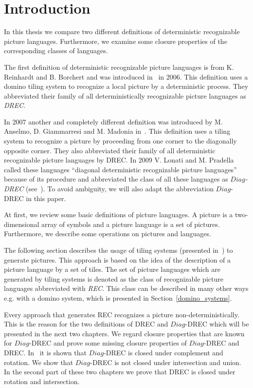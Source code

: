 \section{Introduction}

In this thesis we compare two different definitions of deterministic recognizable picture
languages. Furthermore, we examine some closure properties of the corresponding classes of
languages.

The first definition of deterministic recognizable picture languages is from K. Reinhardt and B.
Borchert and was introduced in~\cite{borchert2006deterministically} in 2006. This definition uses a
domino tiling system to recognize a local picture by a deterministic process. They abbreviated their
family of all deterministically recognizable picture languages as \emph{DREC}.

In 2007 another and completely different definition was introduced by M. Anselmo, D. Giammarresi
and M. Madonia in~\cite{anselmo2007determinism}. This definition uses a tiling system to recognize
a picture by proceeding from one corner to the diagonally opposite corner. They also abbreviated
their family of all deterministic recognizable picture languages by DREC. In 2009 V. Lonati and M.
Pradella called these languages ``diagonal deterministic recognizable picture languages'' because of
its procedure and abbreviated the class of all these languages as \emph{$Diag$-DREC}
(see~\cite{lonati2009snake}). To avoid ambiguity, we will also adapt the abbreviation
$Diag$-DREC in this paper.

At first, we review some basic definitions of picture languages. A picture is a two-dimensional
array of symbols and a picture language is a set of pictures. Furthermore, we describe some
operations on pictures and languages.

The following section describes the usage of tiling systems (presented
in~\cite{giammarresi1992recognizable}) to generate pictures. This approach is based on the idea of
the description of a picture language by a set of tiles. The set of picture languages which are
generated by tiling systems is denoted as the class of recognizable picture languages abbreviated
with \emph{REC}. This class can be described in many other ways e.g. with a domino system, which is
presented in Section~\ref{domino_systems}.

Every approach that generates REC recognizes a picture non-deterministically. This is the reason
for the two definitions of DREC and $Diag$-DREC which will be presented in the next two chapters. We
regard closure properties that are known for $Diag$-DREC and prove some missing closure properties
of $Diag$-DREC and DREC. In~\cite{anselmo2007determinism} it is shown that $Diag$-DREC is closed
under complement and rotation. We show that $Diag$-DREC is not closed under intersection and union.
In the second part of these two chapters we prove that DREC is closed under rotation and
intersection.

